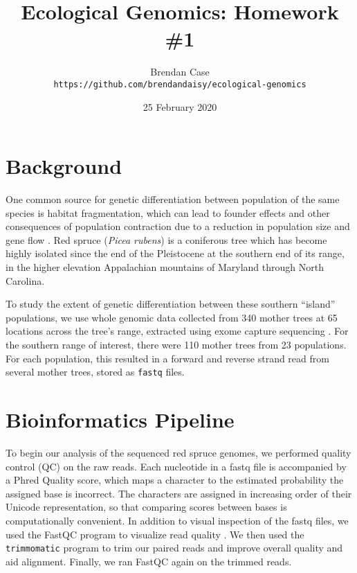 \documentclass[11pt]{scrartcl}
\title{Ecological Genomics: Homework \#1}
\author{Brendan Case\\
\footnotesize{\texttt{https://github.com/brendandaisy/ecological-genomics}}}
\date{25 February 2020}
\newcommand{\todo}[1]{\textcolor{red}{TODO:
    #1}\PackageWarning{TODO:}{#1!}}
\begin{document}
\maketitle

\section{Background}
\label{sec:background}

One common source for genetic differentiation between population of
the same species is habitat fragmentation, which can lead to founder
effects and other consequences of population contraction due to a
reduction in population size and gene flow \cite{Provine2004}. Red
spruce (\textit{Picea rubens}) is a coniferous tree which has become
highly isolated since the end of the Pleistocene at the southern end
of its range, in the higher elevation Appalachian mountains of
Maryland through North Carolina.

To study the extent of genetic differentiation between these southern
``island'' populations, we use whole genomic data collected from 340
mother trees at 65 locations across the tree's range, extracted using
exome capture sequencing \cite{Jones2016}. For the southern range of
interest, there were 110 mother trees from 23 populations. For each
population, this resulted in a forward and reverse strand read from
several mother trees, stored as \texttt{fastq} files.

\section{Bioinformatics Pipeline}
\label{sec:bioinf-pipel}

To begin our analysis of the sequenced red
spruce genomes, we performed quality control (QC) on the raw
reads. Each nucleotide in a fastq file is accompanied by a Phred
Quality score, which maps a character to the estimated probability the
assigned base is incorrect. The characters are assigned in
increasing order of their Unicode representation, so that
comparing scores between bases is computationally convenient. In
addition to visual inspection of the fastq files, we used the FastQC
program to visualize read quality \cite{fastqc}. We then used the
\texttt{trimmomatic} program to trim our paired reads and improve
overall quality and aid alignment. Finally, we ran FastQC again on the
trimmed reads.
\end{document}
